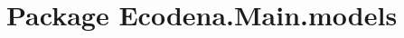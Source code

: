 \hypertarget{namespace_ecodena_1_1_main_1_1models}{
\section{Package Ecodena.Main.models}
\label{df/d0b/namespace_ecodena_1_1_main_1_1models}
}
